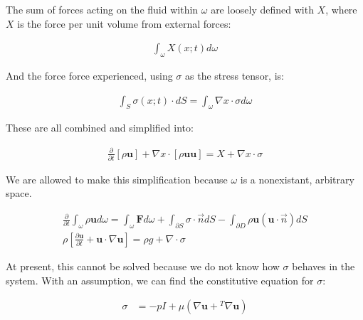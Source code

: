 \documentclass[12pt]{report}
\begin{document}
The sum of forces acting on the fluid within $\omega$ are loosely defined with $X$, where $X$ is the force per unit volume from external forces:

\begin{equation} \label{phenom1}
\begin{split}
\int_\omega X(x;t)d\omega
\end{split}
\end{equation}

And the force force experienced, using $\sigma$ as the stress tensor, is:

\begin{equation} \label{phenom1}
\begin{split}
\int_S \sigma(x;t)\cdot dS = \int_\omega \nabla x \cdot \sigma d\omega
\end{split}
\end{equation}

These are all combined and simplified into: 

\begin{equation} \label{phenom1}
\begin{split}
\frac{\partial}{\partial t}[\rho \mathbf{u}] + \nabla x \cdot [\rho\mathbf{u}\mathbf{u}] = X + \nabla x \cdot \sigma
\end{split}
\end{equation}

We are allowed to make this simplification because $\omega$ is a nonexistant, arbitrary space. 







\begin{equation} \label{phenom1}
\begin{split}
\frac{\partial}{\partial t}\int_\omega \rho\mathbf{u}d\omega = \int_\omega \mathbf{F}d\omega + \int_{\partial S}\sigma \cdot \Vec{n}dS - \int_{\partial D}\rho \mathbf{u}(\mathbf{u}\cdot\Vec{n})dS\\
\rho[\frac{\partial \mathbf{u}}{\partial t} + \mathbf{u}\cdot\nabla \mathbf{u}] = \rho g + \nabla \cdot \sigma
\end{split}
\end{equation}

At present, this cannot be solved because we do not know how $\sigma$ behaves in the system. With an assumption, we can find the constitutive equation for $\sigma$:

\begin{equation} \label{phenom1}
\begin{split}
\sigma &= -p I + \mu(\nabla\mathbf{u} + {}^T\nabla\mathbf{u})
\end{split}
\end{equation}
\end{document}
